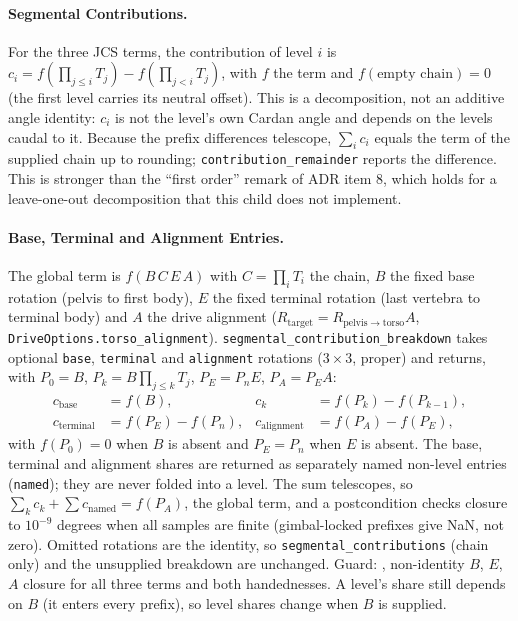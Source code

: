 \paragraph{Segmental Contributions.}
For the three JCS terms, the contribution of level $i$ is
$c_i = f\!\left(\prod_{j\le i}T_j\right)-f\!\left(\prod_{j<i}T_j\right)$, with
$f$ the term and $f(\text{empty chain})=0$ (the first level carries its neutral
offset). This is a decomposition, not an additive angle identity: $c_i$ is not
the level's own Cardan angle and depends on the levels caudal to it. Because the
prefix differences telescope, $\sum_i c_i$ equals the term of the supplied chain
up to rounding; \texttt{contribution\_remainder} reports the difference. This is
stronger than the ``first order'' remark of ADR item 8, which holds for a
leave-one-out decomposition that this child does not implement.

\paragraph{Base, Terminal and Alignment Entries.}
The global term is $f(B\,C\,E\,A)$ with $C=\prod_i T_i$ the chain, $B$ the fixed
base rotation (pelvis to first body), $E$ the fixed terminal rotation (last
vertebra to terminal body) and $A$ the drive alignment
($R_\mathrm{target}=R_{\mathrm{pelvis}\to\mathrm{torso}}A$, \texttt{DriveOptions.torso\_alignment}).
\texttt{segmental\_contribution\_breakdown} takes optional \texttt{base},
\texttt{terminal} and \texttt{alignment} rotations ($3\times3$, proper) and
returns, with $P_0=B$, $P_k=B\prod_{j\le k}T_j$, $P_E=P_nE$, $P_A=P_EA$:
\begin{align*}
  c_\mathrm{base} &= f(B), &
  c_k &= f(P_k)-f(P_{k-1}), \\
  c_\mathrm{terminal} &= f(P_E)-f(P_n), &
  c_\mathrm{alignment} &= f(P_A)-f(P_E),
\end{align*}
with $f(P_0)=0$ when $B$ is absent and $P_E=P_n$ when $E$ is absent. The base,
terminal and alignment shares are returned as separately named non-level entries
(\texttt{named}); they are never folded into a level. The sum telescopes, so
$\sum_k c_k+\sum c_\mathrm{named}=f(P_A)$, the global term, and a
postcondition checks closure to $10^{-9}$ degrees when all samples are finite
(gimbal-locked prefixes give NaN, not zero). Omitted rotations are the identity,
so \texttt{segmental\_contributions} (chain only) and the unsupplied breakdown
are unchanged. Guard:
, non-identity $B$, $E$, $A$
closure for all three terms and both handednesses. A level's share still depends
on $B$ (it enters every prefix), so level shares change when $B$ is supplied.

